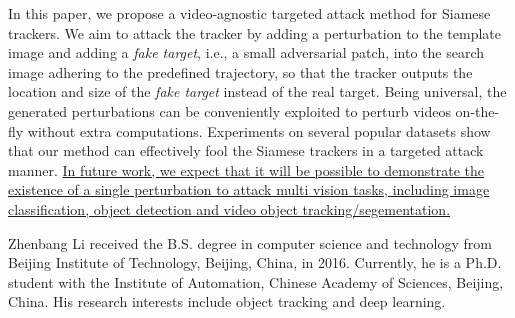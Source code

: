 \documentclass[journal]{IEEEtran}
\newcommand{\ie}{i.e.}
\begin{document}
In this paper, we propose a video-agnostic targeted attack method for Siamese trackers. 
We aim to attack the tracker by adding a perturbation to the template image and adding a \textit{fake target}, \ie, a small adversarial patch, into the search image adhering to the predefined trajectory, so that the tracker outputs the location and size of the \textit{fake target} instead of the real target. Being universal, the generated perturbations can be conveniently exploited to perturb videos on-the-fly without extra computations.
Experiments on several popular datasets show that our method can effectively fool the Siamese trackers in a targeted attack manner.
\uline{In future work, we expect that it will be possible to demonstrate the existence of a single perturbation to attack multi vision tasks, including image classification, object detection and video object tracking/segementation.}

\normalem



\begin{IEEEbiography}
{Zhenbang Li}
received the B.S. degree in computer science and technology from Beijing Institute of Technology, Beijing, China, in 2016. Currently, he is a Ph.D. student with the Institute of Automation, Chinese Academy of Sciences, Beijing, China. His research interests include object tracking and deep learning.
\end{IEEEbiography}
\end{document}
